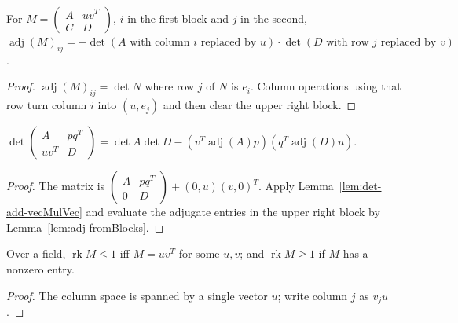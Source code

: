 \begin{lemma}
\label{lem:adj-fromBlocks}
\leanok
For $M=\begin{pmatrix}A&uv^T\\C&D\end{pmatrix}$, $i$ in the first block and $j$ in the second,
$\operatorname{adj}(M)_{ij}=-\det(A\text{ with column }i\text{ replaced by }u)\cdot
\det(D\text{ with row }j\text{ replaced by }v)$.
\end{lemma}

\begin{proof}
\leanok
$\operatorname{adj}(M)_{ij}=\det N$ where row $j$ of $N$ is $e_i$. Column operations using that
row turn column $i$ into $(u,e_j)$ and then clear the upper right block.
\end{proof}

\begin{lemma}
\label{lem:det-fromBlocks}
\leanok
$\det\begin{pmatrix}A&pq^T\\uv^T&D\end{pmatrix}
=\det A\det D-(v^T\operatorname{adj}(A)p)(q^T\operatorname{adj}(D)u)$.
\end{lemma}

\begin{proof}
\leanok
{}
The matrix is $\begin{pmatrix}A&pq^T\\0&D\end{pmatrix}+(0,u)(v,0)^T$. Apply
Lemma~\ref{lem:det-add-vecMulVec} and evaluate the adjugate entries in the upper right block
by Lemma~\ref{lem:adj-fromBlocks}.
\end{proof}

\begin{lemma}
\label{lem:rank-le-one}
\leanok
Over a field, $\operatorname{rk}M\le1$ iff $M=uv^T$ for some $u,v$; and
$\operatorname{rk}M\ge1$ if $M$ has a nonzero entry.
\end{lemma}

\begin{proof}
\leanok
The column space is spanned by a single vector $u$; write column $j$ as $v_ju$.
\end{proof}

